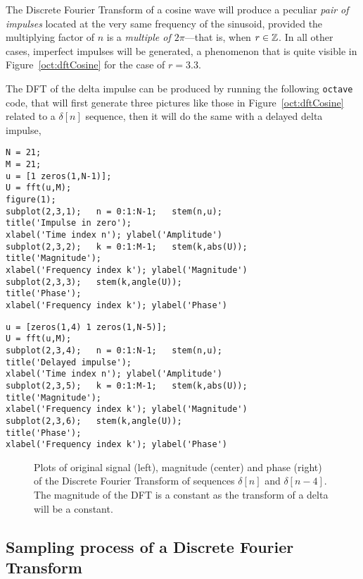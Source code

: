 \documentclass[\documentfontsize, twocolumn]{\classname}
\begin{document}
The Discrete Fourier Transform of a cosine wave will produce a peculiar \emph{pair of impulses} located at the very same frequency of the sinusoid, provided the multiplying factor of $n$ is a \emph{multiple of $2\pi$}---that is, when $r \in \mathbb Z$. In all other cases, imperfect impulses will be generated, a phenomenon that is quite visible in Figure~\ref{oct:dftCosine} for the case of $r=3.3$.

The DFT of the delta impulse can be produced by running the following \texttt{octave} code, that will first generate three pictures like those in Figure~\ref{oct:dftCosine} related to a $\delta[n]$ sequence, then it will do the same with a delayed delta impulse,
\begin{verbatim}
N = 21;
M = 21;
u = [1 zeros(1,N-1)];
U = fft(u,M);
figure(1);
subplot(2,3,1);   n = 0:1:N-1;   stem(n,u);
title('Impulse in zero');
xlabel('Time index n'); ylabel('Amplitude')
subplot(2,3,2);   k = 0:1:M-1;   stem(k,abs(U));
title('Magnitude');
xlabel('Frequency index k'); ylabel('Magnitude')
subplot(2,3,3);   stem(k,angle(U));
title('Phase');
xlabel('Frequency index k'); ylabel('Phase')
\end{verbatim}

\begin{verbatim}
u = [zeros(1,4) 1 zeros(1,N-5)];
U = fft(u,M);
subplot(2,3,4);   n = 0:1:N-1;   stem(n,u);
title('Delayed impulse');
xlabel('Time index n'); ylabel('Amplitude')
subplot(2,3,5);   k = 0:1:M-1;   stem(k,abs(U));
title('Magnitude');
xlabel('Frequency index k'); ylabel('Magnitude')
subplot(2,3,6);   stem(k,angle(U));
title('Phase');
xlabel('Frequency index k'); ylabel('Phase')
\end{verbatim}



\begin{figure*}[ht]
\begin{center}
\scalebox{0.6}{

}\caption{Plots of original signal (left), magnitude (center) and phase (right) of the Discrete Fourier Transform of sequences $\delta[n]$ and $\delta[n-4]$. The magnitude of the DFT is a constant as the transform of a delta will be a constant.}\label{oct:dftImpulse}
\end{center}
\end{figure*}

\subsection{Sampling process of a Discrete Fourier Transform}
\end{document}
